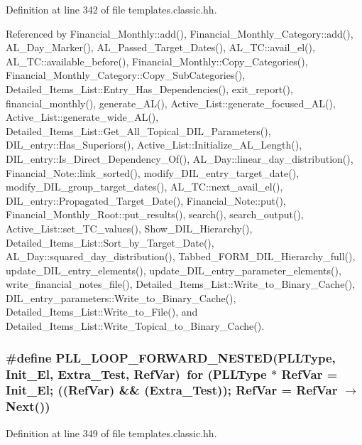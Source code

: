 Definition at line 342 of file templates.classic.hh.

Referenced by Financial\_\-Monthly::add(), Financial\_\-Monthly\_\-Category::add(), AL\_\-Day\_\-Marker(), AL\_\-Passed\_\-Target\_\-Dates(), AL\_\-TC::avail\_\-el(), AL\_\-TC::available\_\-before(), Financial\_\-Monthly::Copy\_\-Categories(), Financial\_\-Monthly\_\-Category::Copy\_\-Sub\-Categories(), Detailed\_\-Items\_\-List::Entry\_\-Has\_\-Dependencies(), exit\_\-report(), financial\_\-monthly(), generate\_\-AL(), Active\_\-List::generate\_\-focused\_\-AL(), Active\_\-List::generate\_\-wide\_\-AL(), Detailed\_\-Items\_\-List::Get\_\-All\_\-Topical\_\-DIL\_\-Parameters(), DIL\_\-entry::Has\_\-Superiors(), Active\_\-List::Initialize\_\-AL\_\-Length(), DIL\_\-entry::Is\_\-Direct\_\-Dependency\_\-Of(), AL\_\-Day::linear\_\-day\_\-distribution(), Financial\_\-Note::link\_\-sorted(), modify\_\-DIL\_\-entry\_\-target\_\-date(), modify\_\-DIL\_\-group\_\-target\_\-dates(), AL\_\-TC::next\_\-avail\_\-el(), DIL\_\-entry::Propagated\_\-Target\_\-Date(), Financial\_\-Note::put(), Financial\_\-Monthly\_\-Root::put\_\-results(), search(), search\_\-output(), Active\_\-List::set\_\-TC\_\-values(), Show\_\-DIL\_\-Hierarchy(), Detailed\_\-Items\_\-List::Sort\_\-by\_\-Target\_\-Date(), AL\_\-Day::squared\_\-day\_\-distribution(), Tabbed\_\-FORM\_\-DIL\_\-Hierarchy\_\-full(), update\_\-DIL\_\-entry\_\-elements(), update\_\-DIL\_\-entry\_\-parameter\_\-elements(), write\_\-financial\_\-notes\_\-file(), Detailed\_\-Items\_\-List::Write\_\-to\_\-Binary\_\-Cache(), DIL\_\-entry\_\-parameters::Write\_\-to\_\-Binary\_\-Cache(), Detailed\_\-Items\_\-List::Write\_\-to\_\-File(), and Detailed\_\-Items\_\-List::Write\_\-Topical\_\-to\_\-Binary\_\-Cache().
\subsubsection{\setlength{\rightskip}{0pt plus 5cm}\#define PLL\_\-LOOP\_\-FORWARD\_\-NESTED({\bf PLLType}, Init\_\-El, Extra\_\-Test, Ref\-Var)\ for ({\bf PLLType} $\ast$ Ref\-Var = Init\_\-El; ((Ref\-Var) \&\& (Extra\_\-Test)); Ref\-Var = Ref\-Var $\rightarrow$ Next())}\label{templates_8classic_8hh_a2}




Definition at line 349 of file templates.classic.hh.

